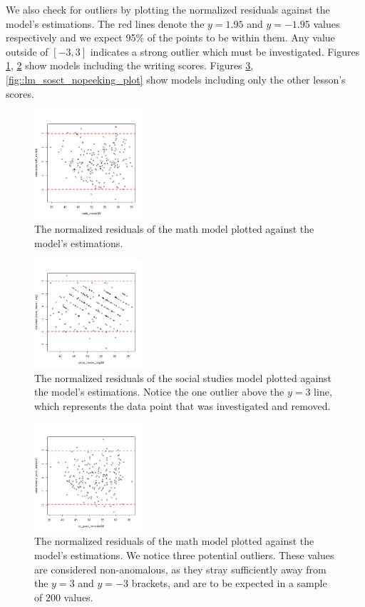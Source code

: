 \documentclass[10pt]{article}
\begin{document}
	We also check for outliers by plotting the normalized residuals against the model's estimations. The red lines denote the $y=1.95$ and $y=-1.95$ values respectively and we expect 95\% of the points to be within them. Any value outside of $[-3,3]$ indicates a strong outlier which must be investigated. Figures \ref{fig::lm_math_plot}, \ref{fig::lm_socst_plot} show models including the writing scores. Figures \ref{fig::lm_math_nopeeking_plot}, \ref{fig::lm_sosct_nopeeking_plot} show models including only the other lesson's scores.
	
	 \begin{figure}
	 	\includegraphics[width=4cm]{lm_math_residual_plot.png}
	 	\centering
	 	\caption{The normalized residuals of the math model plotted against the model's estimations.}
	 	\label{fig::lm_math_plot}
	 \end{figure}
 
	 \begin{figure}
	 	\includegraphics[width=4cm]{lm_socst_residual_plot.png}
	 	\centering
	 	\caption{The normalized residuals of the social studies model plotted against the model's estimations. Notice the one outlier above the $y=3$ line, which represents the data point that was investigated and removed.}
	 	\label{fig::lm_socst_plot}
	 \end{figure}
 
	 \begin{figure}
	 	\includegraphics[width=4cm]{lm_math_nopeeking_residual_plot.png}
	 	\centering
	 	\caption{The normalized residuals of the math model plotted against the model's estimations. We notice three potential outliers. These values are considered non-anomalous, as they stray sufficiently away from the $y=3$ and $y=-3$ brackets, and are to be expected in a sample of 200 values.}
	 	\label{fig::lm_math_nopeeking_plot}
	 \end{figure}
 
\end{document}
